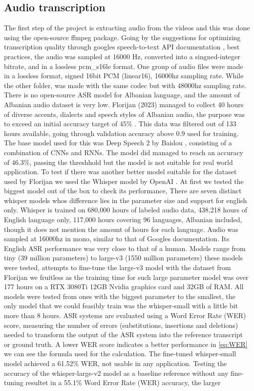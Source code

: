 \documentclass[12pt]{article}
\begin{document}
\subsection{Audio transcription}
The first step of the project is extracting audio from the videos and this was done using the open-source ffmpeg package. Going by the suggestions for optimizing transcription quality through googles speech-to-text API documentation \cite{google_api_docs}, best practices, the audio was sampled at 16000 Hz, converted into a singned-integer bitrate, and in a lossless pcm\_s16le format. One group of audio files were made in a lossless format, signed 16bit PCM (linear16), 16000hz sampling rate. While the other folder, was made with the same codec but with 48000hz sampling rate.\\There is no open-source ASR model for Albanian language, and the amount of Albanian audio dataset is very low. Florijan (2023) managed to collect 40 hours of diverse accents, dialects and speech styles of Albanian audio, the purpose was to exceed an initial accuracy target of 45\% \cite{florijan-qosja}. This data was filtered out of 133 hours available, going through validation accuracy above 0.9 used for training. The base model used for this was Deep Speech 2 by Baidou \cite{deep-speech}, consisting of a combination of CNNs and RNNs. The model did managed to reach an accuracy of 46.3\%, passing the threshhold but the model is not suitable for real world application. To test if there was another better model suitable for the dataset used by Florijan we used the Whisper model by OpenAI \cite{openai_whisper}. At first we tested the biggest model out of the box to check its performance, There are seven distinct whisper models whos difference lies in the parameter size and support for english only. Whisper is trained on 680,000 hours of labeled audio data, 438,218 hours of English language only, 117,000 hours covering 96 languages, Albanian included, though it does not mention the amount of hours for each language. Audio was sampled at 16000hz in mono, similar to that of Googles documentation. Its English ASR performance was very close to that of a human. Models range from tiny (39 million parameters) to large-v3 (1550 million parameters) these models were tested, attempts to fine-tune the large-v3 model with the dataset from Florijan we fruitless as the training time for such large parameter model was over 177 hours on a RTX 3080Ti 12GB Nvidia graphics card and 32GB of RAM. All models were tested from ones with the biggest parameter to the smallest, the only model that we could feasibly train was the whisper-small with a little bit more than 8 hours. ASR systems are evaluated using a Word Error Rate (WER) score, measuring the number of errors (substitutions, insertions and deletions) needed to transform the output of the ASR system into the reference transcript or ground truth. A lower WER score indicates a better performance in \ref{eq:WER} we can see the formula used for the calculation. The fine-tuned whisper-small model achieved a 61.52\% WER, not usable in any application. Testing the accuracy of the whisper-large-v2 model as a baseline reference without any fine-tuning resultet in a 55.1\% Word Error Rate (WER) accuracy, the larger 
\end{document}
